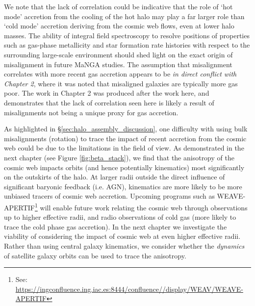 We note that the lack of correlation could be indicative that the role of `hot mode' accretion from the cooling of the hot halo may play a far larger role than `cold mode' accretion deriving from the cosmic web flows, even at lower halo masses. The ability of integral field spectroscopy to resolve positions of properties such as gas-phase metallicity and star formation rate histories with respect to the surrounding large-scale environment should shed light on the exact origin of misalignment in future MaNGA studies. The assumption that misalignment correlates with more recent gas accretion appears to be \textit{in direct conflict with Chapter 2}, where it was noted that misaligned galaxies are typically more gas poor. The work in Chapter 2 was produced after the work here, and demonstrates that the lack of correlation seen here is likely a result of misalignments not being a unique proxy for gas accretion. 

As highlighted in \S\ref{sec:halo_assembly_discussion}, one difficulty with using bulk misalignments (rotation) to trace the impact of recent accretion from the cosmic web could be due to the limitations in the field of view. As demonstrated in the next chapter (see Figure \ref{fig:beta_stack}), we find that the anisotropy of the cosmic web impacts orbits (and hence potentially kinematics) most significantly on the outskirts of the halo. At larger radii outside the direct influence of significant baryonic feedback (i.e. AGN), kinematics are more likely to be more unbiased tracers of cosmic web accretion. Upcoming programs such as WEAVE-APERTIF\footnote{See: \url{https://ingconfluence.ing.iac.es:8444/confluence//display/WEAV/WEAVE-APERTIF}} will enable future work relating the cosmic web through observations up to higher effective radii, and radio observations of cold gas (more likely to trace the cold phase gas accretion). In the next chapter we investigate the viability of considering the impact of cosmic web at even higher effective radii. Rather than using central galaxy kinematics, we consider whether the \textit{dynamics} of satellite galaxy orbits can be used to trace the anisotropy. 